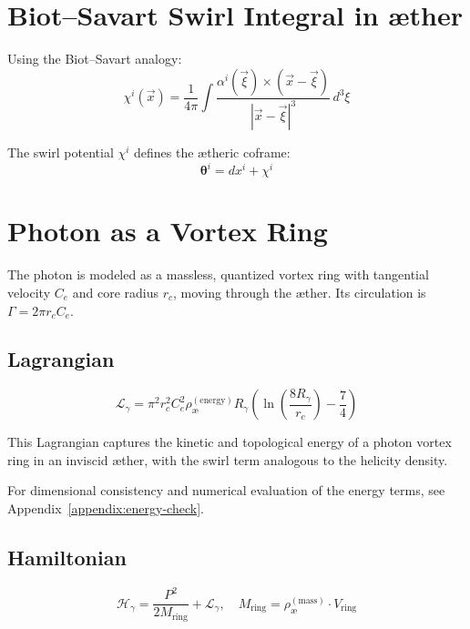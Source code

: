 \section{Biot--Savart Swirl Integral in \ae ther}\label{sec:biot-savart}

        Using the Biot--Savart analogy:
        \begin{equation}
            \chi^i(\vec{x}) = \frac{1}{4\pi} \int \frac{\alpha^i(\vec{\xi}) \times (\vec{x} - \vec{\xi})}{|\vec{x} - \vec{\xi}|^3} \, d^3\xi
        \end{equation}

        The swirl potential $\chi^i$ defines the \ae theric coframe:
        \begin{equation}
            \boldsymbol{\theta}^i = dx^i + \chi^i
        \end{equation}

\section{Photon as a Vortex Ring}

        The photon is modeled as a massless, quantized vortex ring with tangential velocity $C_e$ and core radius $r_c$, moving through the \ae ther. Its circulation is $\Gamma = 2\pi r_c C_e$.

        \subsection{Lagrangian}
        \begin{equation}
            \mathcal{L}_\gamma = \pi^2 r_c^2 C_e^2 \rho_\text{\ae}^{(\text{energy})} R_\gamma \left( \ln\left( \frac{8R_\gamma}{r_c} \right) - \frac{7}{4} \right)
        \end{equation}

        This Lagrangian captures the kinetic and topological energy of a photon vortex ring in an inviscid æther, with the swirl term analogous to the helicity density.

        For dimensional consistency and numerical evaluation of the energy terms, see Appendix~\ref{appendix:energy-check}.

        \subsection{Hamiltonian}
        \begin{equation}
            \mathcal{H}_\gamma = \frac{P^2}{2M_{\text{ring}}} + \mathcal{L}_\gamma, \quad M_{\text{ring}} = \rho_\text{\ae}^{(\text{mass})} \cdot V_{\text{ring}}
        \end{equation}

